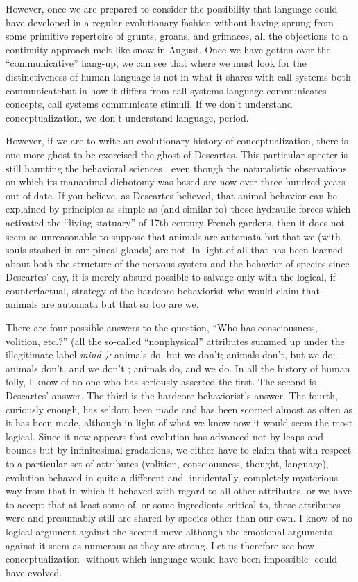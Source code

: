 However, once we are prepared to consider the possibility that language could have developed in a regular evolutionary fashion with\-out having sprung from some primitive repertoire of grunts, groans, and grimaces, all the objections to a continuity approach melt like snow in August. Once we have gotten over the ``communicative'' hang-up, we can see that where we must look for the distinctiveness of human language is not in what it shares with call systems-both communicate\-but in how it differs from call systems-language communicates con\-cepts, call systems communicate stimuli. If we don't understand con\-ceptualization, we don't understand language, period.

However, if we are to write an evolutionary history of con\-ceptualization, there is one more ghost to be exorcised-the ghost of Descartes. This particular specter is still haunting the behavioral sci\-ences . even though the naturalistic observations on which its man\-animal dichotomy was based are now over three hundred years out of date. If you believe, as Descartes believed, that animal behavior can be explained by principles as simple as (and similar to) those hydraulic forces which activated the ``living statuary'' of 17th-century French gardens, then it does not seem so unreasonable to suppose that animals are automata but that we (with souls stashed in our pineal glands) are not. In light of all that has been learned about both the structure of the nervous system and the behavior of species since Descartes' day, it is merely absurd-possible to salvage only with the logical, if counter\-factual, strategy of the hardcore behaviorist who would claim that animals are automata but that so too are we.


There are four possible answers to the question, ``Who has con\-sciousness, volition, etc.?'' (all the so-called ``nonphysical'' attributes summed up under the illegitimate label \textit{mind} \textit{):} animals do, but we don't; animals don't, but we do; animals don't, and we don't ; animals do, and we do. In all the history of human folly, I know of no one who has seriously asserted the first. The second is Descartes' answer. The third is the hardcore behaviorist's answer. The fourth, curiously enough, has seldom been made and has been scorned almost as often as it has been made, although in light of what we know now it would seem the most logical. Since it now appears that evolution has ad\-vanced not by leaps and bounds but by infinitesimal gradations, we either have to claim that with respect to a particular set of attributes (volition, consciousness, thought, language), evolution behaved in quite a different-and, incidentally, completely mysterious-way from that in which it behaved with regard to all other attributes, or we have to accept that at least some of, or some ingredients critical to, these attributes were and presumably still are shared by species other than our own. I know of no logical argument against the second move although the emotional arguments against it seem as numerous as they are strong. Let us therefore see how conceptualization- without which language would have been impossible- could have evolved.

